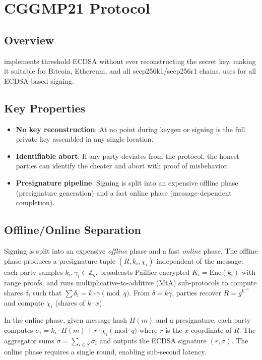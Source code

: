 \section{CGGMP21 Protocol}

\label{sec:cggmp}

\subsection{Overview}

\CGGMP{} \cite{canetti2021cggmp} implements threshold ECDSA without ever reconstructing the secret key, making it suitable for Bitcoin, Ethereum, and all secp256k1/secp256r1 chains. \TChain{} uses \CGGMP{} for all ECDSA-based signing.

\subsection{Key Properties}

\begin{itemize}
\item \textbf{No key reconstruction}: At no point during keygen or signing is the full private key assembled in any single location.
\item \textbf{Identifiable abort}: If any party deviates from the protocol, the honest parties can identify the cheater and abort with proof of misbehavior.
\item \textbf{Presignature pipeline}: Signing is split into an expensive offline phase (presignature generation) and a fast online phase (message-dependent completion).
\end{itemize}

\subsection{Offline/Online Separation}

Signing is split into an expensive \emph{offline} phase and a fast \emph{online} phase. The offline phase produces a presignature tuple $(R, k_i, \chi_i)$ independent of the message: each party samples $k_i, \gamma_i \in \mathbb{Z}_q$, broadcasts Paillier-encrypted $K_i = \text{Enc}(k_i)$ with range proofs, and runs multiplicative-to-additive (MtA) sub-protocols to compute shares $\delta_i$ such that $\sum \delta_i = k \cdot \gamma \pmod{q}$. From $\delta = k\gamma$, parties recover $R = g^{k^{-1}}$ and compute $\chi_i$ (shares of $k \cdot x$).

In the online phase, given message hash $H(m)$ and a presignature, each party computes $\sigma_i = k_i \cdot H(m) + r \cdot \chi_i \pmod{q}$ where $r$ is the $x$-coordinate of $R$. The aggregator sums $\sigma = \sum_{i \in S} \sigma_i$ and outputs the ECDSA signature $(r, \sigma)$. The online phase requires a single round, enabling sub-second latency.

